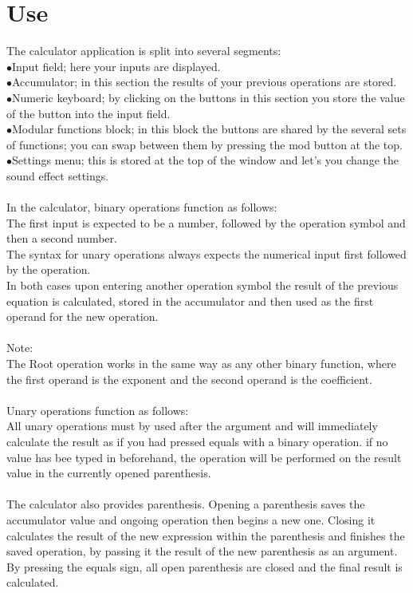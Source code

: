 \documentclass{article}
\begin{document}
\section{Use}
	The calculator application is split into several segments:\\
	$\bullet$Input field; here your inputs are displayed.\\
	$\bullet$Accumulator; in this section the results of your previous operations are stored.\\
	$\bullet$Numeric keyboard; by clicking on the buttons in this section you store the value of the button into the input field.\\
	$\bullet$Modular functions block; in this block the buttons are shared by the several sets of functions; you can swap between them by pressing the mod button at the top.\\
	$\bullet$Settings menu; this is stored at the top of the window and let's you change the sound effect settings.\\
	\\
	In the calculator, binary operations function as follows:\\
	The first input is expected to be a number, followed by the operation symbol and then a second number.\\
	The syntax for unary operations always expects the numerical input first followed by the operation.\\
	In both cases upon entering another operation symbol the result of the previous equation is calculated, stored in the accumulator and then used as the first operand for the new operation.\\
	\\
	Note:\\
	The Root operation works in the same way as any other binary function, where the first operand is the exponent and the second operand is the coefficient. \\
	\\
	Unary operations function as follows:\\
	All unary operations must by used after the argument and will immediately calculate the result as if you had pressed equals with a binary operation. if no value has bee typed in beforehand, the operation will be performed on the result value in the currently opened parenthesis.\\
	\\
	The calculator also provides parenthesis. Opening a parenthesis saves the accumulator value and ongoing operation then begins a new one. Closing it calculates the result of the new expression within the parenthesis and finishes the saved operation, by passing it the result of the new parenthesis as an argument. By pressing the equals sign, all open parenthesis are closed and the final result is calculated.
\end{document}
